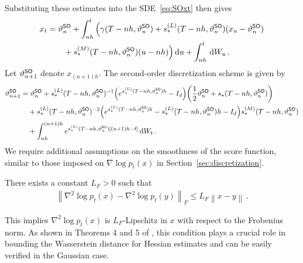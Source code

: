 \documentclass[11pt]{article}
\def\rmd{{\,\rm d}}
\def\l|{\left\lVert}
\def\r|{\right\rVert}
\begin{document}
Substituting these estimates into the SDE~\eqref{eq:SOxt} then gives
\begin{align*}
    x_t&=\vartheta_n^{\sf SO}+\int_{nh}^t\Big(\gamma(T-nh,\vartheta_n^{\sf SO})+s_*^{(L)}(T-nh,\vartheta_n^{\sf SO})(x_u-\vartheta_n^{\sf SO})\\
    &\qquad +s_*^{(M)}(T-nh,\vartheta_n^{\sf SO})(u-nh)\Big)\rmd u+\int_{nh}^t\rmd W_u\,.
\end{align*}
Let $\vartheta_{n+1}^{\sf SO}$ denote $x_{(n+1)h}$. 
The second-order discretization scheme is given by
\begin{align*}
    \vartheta_{n+1}^{\sf SO}
    &=\vartheta_n^{\sf SO}+s_*^{(L)}(T-nh,\vartheta_n^{\sf SO})^{-1}\left(e^{s_*^{(L)}(T-nh,\vartheta_n^{\sf SO})h}-I_d\right)\left(\dfrac{1}{2}\vartheta_n^{\sf SO}+s_*(T-nh,\vartheta_n^{\sf SO})\right)\\
    &\quad +s_*^{(L)}(T-nh,\vartheta_n^{\sf SO})^{-2}\left(e^{s_*^{(L)}(T-nh,\vartheta_n^{\sf SO})h}-s_*^{(L)}(T-nh,\vartheta_n^{\sf SO})h-I_d\right) s_*^{(M)}(T-nh,\vartheta_n^{\sf SO})\\
    &\quad +\int_{nh}^{(n+1)h}e^{s_*^{(L)}(T-nh,\vartheta_n^{\sf SO})[(n+1)h-t]}\rmd W_t\,.
\end{align*}
We require additional assumptions on the smoothness of the score function, similar to those imposed on $\nabla\log p_t(x)$ in Section~\ref{sec:discretization}.
\begin{assumption}
    \label{asm:scLipx4SO}
   There exists a constant $L_F>0$ such that 
    \begin{align*}
        \left\lVert\nabla^2\log p_t(x)-\nabla^2\log p_t(y)\right\rVert_F\leqslant L_F\l|x-y\r|\,.
    \end{align*}
\end{assumption}
This implies $\nabla^2\log p_t(x)$ is $L_F$-Lipschitz in $x$ with respect to the Frobenius norm. 
As shown in Theorems 4 and 5 of \cite{liang2024broadening}, this condition plays a crucial role in bounding the Wasserstein distance for Hessian estimates and can be easily verified in the Gaussian case.
\end{document}
